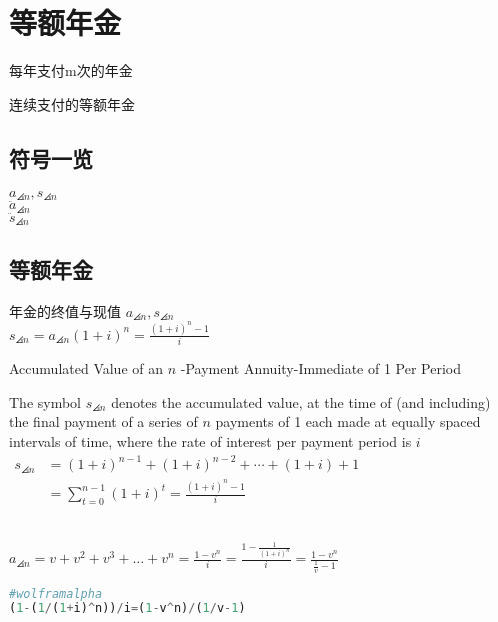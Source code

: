 \chapter{等额年金}
\begin{introduction}
	\item 每年支付m次的年金
	\item 连续支付的等额年金
\end{introduction}
\section{符号一览}
\noindent$a_{\angles{n}},s_{\angles{n}}$\\	$\ddot{a}_{\angles{n}}$\\$\ddot{s}_{\angles{n}}$
\section{等额年金}
\begin{definition}{年金的终值与现值}
\noindent $a_{\angles{n}},s_{\angles{n}}$\\
$s_{\angles{n}}=a_{\angles{n}}(1+i)^{n}=\frac{(1+i)^{n}-1}{i}$
\end{definition}
\begin{definition}{Accumulated Value of an $n$ -Payment Annuity-Immediate of 1 Per Period}

	The symbol $s_{\angles{n}}$ denotes the accumulated value, at the time of (and including) the final payment of a series of $n$ payments of 1 each made at equally spaced intervals of time, where the rate of interest per payment period is $i$
	$\begin{aligned}
	s_{\angles{n}} &=(1+i)^{n-1}+(1+i)^{n-2}+\cdots+(1+i)+1 \\
	&=\sum_{t=0}^{n-1}(1+i)^{t}=\frac{(1+i)^{n}-1}{i}
	\end{aligned}$
\end{definition}
 \\
\noindent $a_{\angles{n}}=v+v^2+v^3+\dots+v^n=\frac{1-v^n}{i}=\frac{1-\frac{1}{(1+i)^n}}{i}=\frac{1-v^n}{\frac{1}{v}-1}$\\
\begin{lstlisting}[language={python}]
#wolframalpha
(1-(1/(1+i)^n))/i=(1-v^n)/(1/v-1)
\end{lstlisting}

